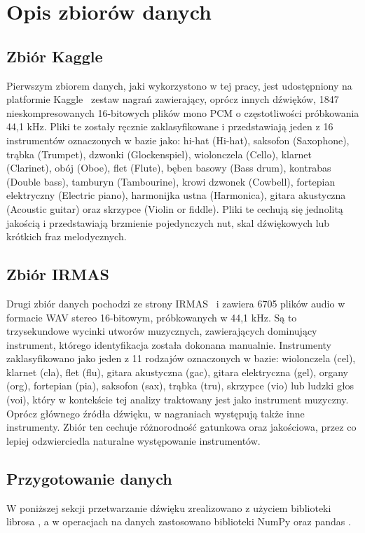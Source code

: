 \documentclass{SGGW-thesis}
\begin{document}
\chapter{Opis zbiorów danych}

\section{ Zbiór Kaggle}
Pierwszym zbiorem danych, jaki wykorzystono w tej pracy, jest udostępniony na platformie Kaggle~\cite{howard2018freesound} zestaw nagrań zawierający, oprócz innych dźwięków, 1847 nieskompresowanych 16-bitowych plików mono PCM o częstotliwości próbkowania 44,1 kHz. Pliki te zostały ręcznie zaklasyfikowane i przedstawiają jeden z 16 instrumentów oznaczonych w bazie jako: hi-hat (Hi-hat), saksofon (Saxophone), trąbka (Trumpet), dzwonki (Glockenspiel), wiolonczela (Cello), klarnet (Clarinet), obój (Oboe), flet (Flute), bęben basowy (Bass drum), kontrabas (Double bass), tamburyn (Tambourine), krowi dzwonek (Cowbell), fortepian elektryczny (Electric piano), harmonijka ustna (Harmonica), gitara akustyczna (Acoustic guitar) oraz skrzypce (Violin or fiddle). Pliki te cechują się jednolitą jakością i przedstawiają brzmienie pojedynczych nut, skal dźwiękowych lub krótkich fraz melodycznych.

\section{ Zbiór IRMAS}
Drugi zbiór danych pochodzi ze strony IRMAS~\cite{bosch2012irmas} i zawiera 6705 plików audio w formacie WAV stereo 16-bitowym, próbkowanych w 44,1 kHz. Są to trzysekundowe wycinki utworów muzycznych, zawierających dominujący instrument, którego identyfikacja została dokonana manualnie. Instrumenty zaklasyfikowano jako jeden z 11 rodzajów oznaczonych w bazie: wiolonczela (cel), klarnet (cla), flet (flu), gitara akustyczna (gac), gitara elektryczna (gel), organy (org), fortepian (pia), saksofon (sax), trąbka (tru), skrzypce (vio) lub ludzki głos (voi), który w kontekście tej analizy traktowany jest jako instrument muzyczny. Oprócz głównego źródła dźwięku, w nagraniach występują także inne instrumenty. Zbiór ten cechuje różnorodność gatunkowa oraz jakościowa, przez co lepiej odzwierciedla naturalne występowanie instrumentów.

\section{Przygotowanie danych}
W poniższej sekcji przetwarzanie dźwięku zrealizowano z użyciem biblioteki librosa \cite{mcfee2015librosa}, a w operacjach na danych zastosowano biblioteki NumPy \cite{harris2020array} oraz pandas \cite{mckinney2010data}. 
\end{document}
